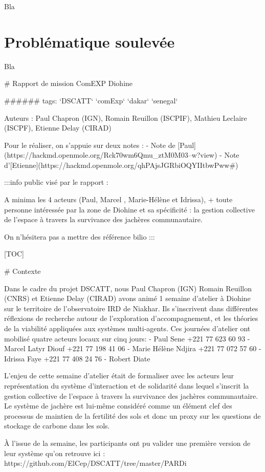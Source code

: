 Bla

\newpage

\section{Problématique soulevée}

Bla


# Rapport de mission ComEXP  Diohine

###### tags: `DSCATT` `comExp` `dakar` `senegal`

Auteurs : Paul Chapron (IGN), Romain Reuillon (ISCPIF), Mathieu Leclaire (ISCPF), Etienne Delay (CIRAD)

Pour le réaliser, on s'appuie sur deux notes : 
- Note de [Paul](https://hackmd.openmole.org/Rck70wm6Qmu_ztM0M03--w?view)
- Note d'[Etienne](https://hackmd.openmole.org/qhPAjsJGRbiOQYIItbwPww#)


:::info
public visé par le rapport : 

A minima les 4 acteurs (Paul, Marcel ,  Marie-Hélène et Idrissa), + toute personne intéressée par la zone de Diohine et sa spécificité : la gestion collective de l’espace à travers la survivance des jachères communautaire.

On n'hésitera pas a mettre des référence bilio
:::

[TOC]

# Contexte

Dans le cadre du projet DSCATT, nous Paul Chapron (IGN) Romain Reuillon (CNRS) et Etienne Delay (CIRAD) avons animé 1 semaine d'atelier à Diohine sur le territoire de l'observatoire IRD de Niakhar. Ils s'inscrivent dans différentes réflexions de recherche autour de l'exploration d'accompagnement, et les théories de la viabilité appliquées aux systèmes multi-agents.
Ces journées d'atelier ont mobilisé quatre acteurs locaux sur cinq jours: 
- Paul Sene +221 77 623 60 93
- Marcel Latyr Diouf +221 77 198 41 06
- Marie Hélène Ndjira +221 77 072 57 60
- Idrissa Faye +221 77 408 24 76
- Robert Diate 

L'enjeu de cette semaine d'atelier était de formaliser avec les acteurs leur représentation du système d'interaction et de solidarité dans lequel s'inscrit la gestion collective de l'espace à travers la survivance des jachères communautaire. Le système de jachère est lui-même considéré comme un élément clef des processus de maintien de la fertilité des sols et donc un proxy sur les questions de stockage de carbone dans les sols. 

À l'issue de la semaine, les participants ont pu valider une première version de leur système qu'on retrouve ici : https://github.com/ElCep/DSCATT/tree/master/PARDi

